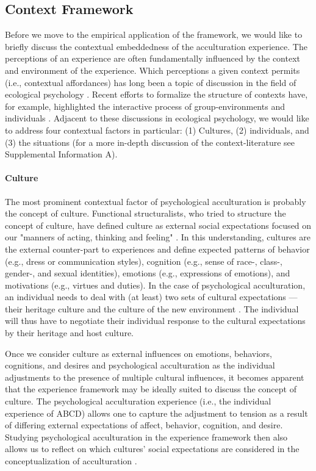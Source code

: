 \documentclass[nobib]{tufte-handout}
\begin{document}
\subsection{Context Framework}
Before we move to the empirical application of the framework, we would like to briefly discuss the contextual embeddedness of the acculturation experience. 
The perceptions of an experience are often fundamentally influenced by the context and environment of the experience. Which perceptions a given context permits (i.e., contextual affordances) has long been a topic of discussion in the field of ecological psychology \citep[e.g., see][]{Cantor1994}. Recent efforts to formalize the structure of contexts have, for example, highlighted the interactive process of group-environments and individuals \citep[e.g.,][]{Young2002}.
Adjacent to these discussions in ecological psychology, we would like to address four contextual factors in particular: (1) Cultures, (2) individuals, and (3) the situations (for a more in-depth discussion of the context-literature see Supplemental Information A).

\paragraph{Culture}
The most prominent contextual factor of psychological acculturation is probably the concept of culture. Functional structuralists, who tried to structure the concept of culture, have defined culture as external social expectations focused on our "manners of acting, thinking and feeling" \citep[][p. 52; on social facts]{Durkheim1982}. In this understanding, cultures are the external counter-part to experiences and define expected patterns of behavior (e.g., dress or communication styles), cognition (e.g., sense of race-, class-, gender-, and sexual identities), emotions (e.g., expressions of emotions), and motivations (e.g., virtues and duties). In the case of psychological acculturation, an individual needs to deal with (at least) two sets of cultural expectations --- their heritage culture and the culture of the new environment \citep[e.g., see models of][]{Berry1997b, Berry2006a}. The individual will thus have to negotiate their individual response to the cultural expectations by their heritage and host culture.

Once we consider culture as external influences on emotions, behaviors, cognitions, and desires and psychological acculturation as the individual adjustments to the presence of multiple cultural influences, it becomes apparent that the experience framework may be ideally suited to discuss the concept of culture. The psychological acculturation experience (i.e., the individual experience of ABCD) allows one to capture the adjustment to tension as a result of differing external expectations of affect, behavior, cognition, and desire. Studying psychological acculturation in the experience framework then also allows us to reflect on which cultures' social expectations are considered in the conceptualization of acculturation \citep{Bhatia2001}. 
\end{document}
